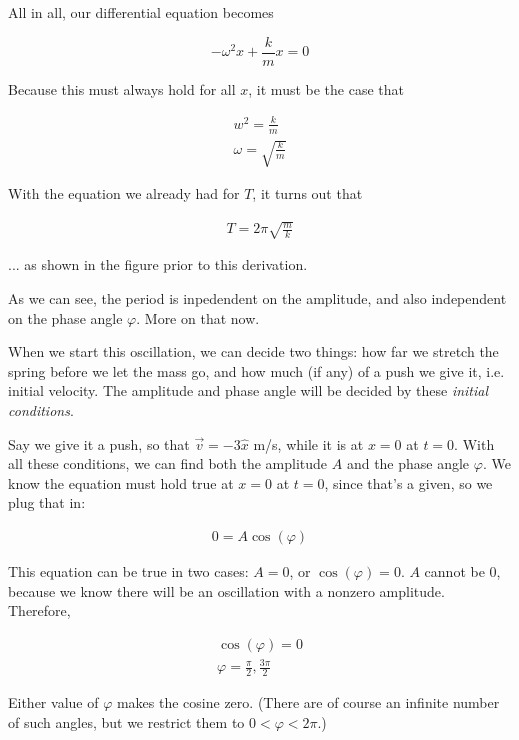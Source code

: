 \documentclass[12pt,a4paper]{report}
\begin{document}
All in all, our differential equation becomes

\begin{equation}
- \omega^2 x + \frac{k}{m} x = 0
\end{equation}

Because this must always hold for all $x$, it must be the case that

\begin{align}
w^2 = \frac{k}{m}\\
\omega = \sqrt{\frac{k}{m}}
\end{align}

With the equation we already had for $T$, it turns out that

\begin{align}
T = 2 \pi \sqrt{\frac{m}{k}}
\end{align}

... as shown in the figure prior to this derivation.

As we can see, the period is inpedendent on the amplitude, and also independent on the phase angle $\varphi$. More on that now.

When we start this oscillation, we can decide two things: how far we stretch the spring before we let the mass go, and how much (if any) of a push we give it, i.e. initial velocity. The amplitude and phase angle will be decided by these \emph{initial conditions}.

Say we give it a push, so that $\vec{v} = -3\hat{x}$ m/s, while it is at $x = 0$ at $t = 0$. With all these conditions, we can find both the amplitude $A$ and the phase angle $\varphi$. We know the equation must hold true at $x = 0$ at $t = 0$, since that's a given, so we plug that in:

\begin{align}
0 = A \cos(\varphi)
\end{align}

This equation can be true in two cases: $A = 0$, or $\cos(\varphi) = 0$. $A$ cannot be 0, because we know there will be an oscillation with a nonzero amplitude. Therefore,

\begin{align}
\cos(\varphi) = 0\\
\varphi = \frac{\pi}{2}, \frac{3\pi}{2}
\end{align}

Either value of $\varphi$ makes the cosine zero. (There are of course an infinite number of such angles, but we restrict them to $0 < \varphi < 2\pi$.)
\end{document}
